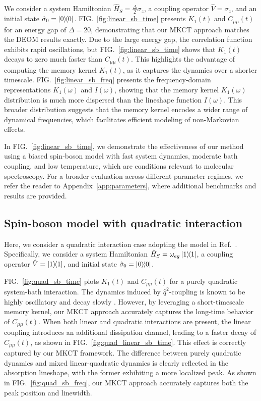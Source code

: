 \documentclass[preprint,aip,jcp]{revtex4-2}
\begin{document}
We consider a system Hamiltonian $\hat{H}_S = \frac{\Delta}{2} \sigma_z$, a coupling operator $\hat{V} = \sigma_z$, and an initial state $\hat{\sigma}_0 = \ketbra{0}{0}$. FIG.~\ref{fig:linear_sb_time} presents $K_1(t)$ and $C_{\mu\mu}(t)$ for an energy gap of $\Delta = 20$, demonstrating that our MKCT approach matches the DEOM results exactly. Due to the large energy gap, the correlation function exhibits rapid oscillations, but FIG.~\ref{fig:linear_sb_time} shows that $K_1(t)$ decays to zero much faster than $C_{\mu\mu}(t)$. This highlights the advantage of computing the memory kernel $K_1(t)$, as it captures the dynamics over a shorter timescale. FIG.~\ref{fig:linear_sb_freq} presents the frequency-domain representations $K_1(\omega)$ and $I(\omega)$, showing that the memory kernel $K_1(\omega)$ distribution is much more dispersed than the lineshape function $I(\omega)$. This broader distribution suggests that the memory kernel encodes a wider range of dynamical frequencies, which facilitates efficient modeling of non-Markovian effects. 

In FIG.~\ref{fig:linear_sb_time}, we demonstrate the effectiveness of our method using a biased spin-boson model with fast system dynamics, moderate bath coupling, and low temperature, which are conditions relevant to molecular spectroscopy. For a broader evaluation across different parameter regimes, we refer the reader to Appendix~\ref{app:parameters}, where additional benchmarks and results are provided.

\subsection{Spin-boson model with quadratic interaction \label{subsec:sb_quad}}

Here, we consider a quadratic interaction case adopting the model in Ref.~\cite{Xu2018Nonlinear}. Specifically, we consider a system Hamiltonian $\hat{H}_S = \omega_{eg} \ketbra{1}{1}$, a coupling operator $\hat{V}=\ketbra{1}{1}$, and initial state $\hat{\sigma}_0 = \ketbra{0}{0}$. 

FIG.~\ref{fig:quad_sb_time} plots $K_1(t)$ and $C_{\mu\mu}(t)$ for a purely quadratic system-bath interaction. The dynamics induced by $\hat{q}^2$-coupling is known to be highly oscillatory and decay slowly \cite{zihao2023CaldeiraLeggett,Bi2024quad}. However, by leveraging a short-timescale memory kernel, our MKCT approach accurately captures the long-time behavior of $C_{\mu\mu}(t)$. When both linear and quadratic interactions are present, the linear coupling introduces an additional dissipation channel, leading to a faster decay of $C_{\mu\mu}(t)$,  as shown in FIG.~\ref{fig:quad_linear_sb_time}. This effect is correctly captured by our MKCT framework. The difference between purely quadratic dynamics and mixed linear-quadratic dynamics is clearly reflected in the absorption lineshape, with the former exhibiting a more localized peak. As shown in FIG.~\ref{fig:quad_sb_freq}, our MKCT approach accurately captures both the peak position and linewidth.
\end{document}
